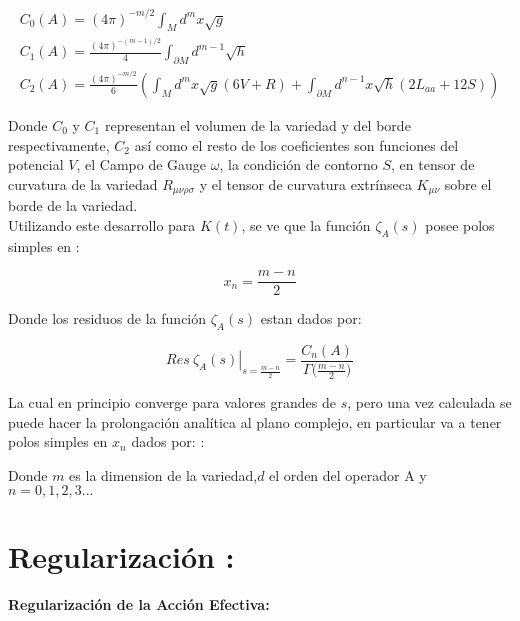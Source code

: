 \begin{equation}
\begin{array}{c}
C _0 (A) = (4 \pi ) ^{-m/2}  \int _M d ^m x \sqrt{g}  \\[10pt]
C _1 (A) = \frac{(4 \pi) ^{-(m-1)/2} }{4} \int _{\partial M } d ^{m-1} \sqrt{h} \\[10pt]
C _2 (A) = \frac{(4 \pi) ^{-m/2} }{6} \left(
									\int _M d ^m x\sqrt{g} (6 V + R) +
									\int _{\partial M } d ^{n-1} x 
									\sqrt{h} (2 L _{aa}  + 12 S)
									\right)
\end{array}
\end{equation} 

Donde $C _0$ y $C _1$ representan el volumen de la variedad y del borde respectivamente, $C _2$ así como el resto de los coeficientes son funciones del potencial $V$, el Campo de Gauge $\omega $, la condición de contorno $S$, en tensor de curvatura de la variedad $R _{\mu \nu \rho \sigma }$ y el tensor de curvatura extrínseca $K _{\mu \nu }$ sobre el borde de la variedad. \\


Utilizando este desarrollo para $K(t)$, se ve que la función $\zeta _A (s)$ posee polos simples en :


\begin{equation}
x _n = \frac{m-n}{2} 
\label{eq.ceros.zeta}
\end{equation}


Donde los residuos de la función $\zeta _A (s) $ estan dados por:

\begin{equation}
\left. Res \ \zeta _A (s)  \right| _{s= \frac{m - n}{2}} =  
\frac{ C_n  (A) }{ {\Gamma ( \frac{m-n}{2}} ) }
\end{equation}


La cual en principio converge para valores grandes de $s$, pero una vez calculada se puede hacer la prolongación analítica al plano complejo, en particular va a tener polos simples en $x _n$ dados por:   :

Donde $m$ es la dimension de la variedad,$d$ el orden del operador A y $n= 0,1,2,3 ...$ \\


\section{Regularización :}

\textbf{Regularización de la Acción Efectiva:} \\

